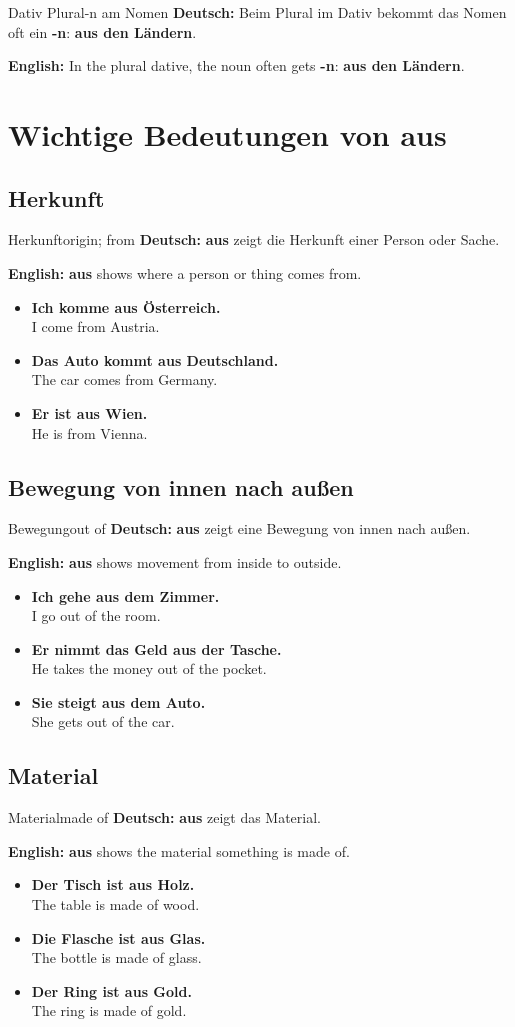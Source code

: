 \documentclass[a4paper,11pt]{article}
\newcommand{\GermanText}[1]{\textbf{Deutsch: }#1\par}
\newcommand{\EnglishText}[1]{{\small\color{SoftGray}\textbf{English: }#1\par}}
\newcommand{\ExampleItem}[2]{\item \textbf{#1}\\{\small\color{SoftGray}#2}}
\begin{document}
\begin{grammarentry}{Dativ Plural}{-n am Nomen}
\GermanText{Beim Plural im Dativ bekommt das Nomen oft ein \textbf{-n}: \textbf{aus den Ländern}.}
\EnglishText{In the plural dative, the noun often gets \textbf{-n}: \textbf{aus den Ländern}.}
\end{grammarentry}

\section{Wichtige Bedeutungen von \glqq aus\grqq}

\subsection{Herkunft}
\begin{grammarentry}{Herkunft}{origin; from}
\GermanText{\textbf{aus} zeigt die Herkunft einer Person oder Sache.}
\EnglishText{\textbf{aus} shows where a person or thing comes from.}
\end{grammarentry}
\begin{exbox}
\begin{itemize}
\ExampleItem{Ich komme aus Österreich.}{I come from Austria.}
\ExampleItem{Das Auto kommt aus Deutschland.}{The car comes from Germany.}
\ExampleItem{Er ist aus Wien.}{He is from Vienna.}
\end{itemize}
\end{exbox}

\subsection{Bewegung von innen nach außen}
\begin{grammarentry}{Bewegung}{out of}
\GermanText{\textbf{aus} zeigt eine Bewegung von innen nach außen.}
\EnglishText{\textbf{aus} shows movement from inside to outside.}
\end{grammarentry}
\begin{exbox}
\begin{itemize}
\ExampleItem{Ich gehe aus dem Zimmer.}{I go out of the room.}
\ExampleItem{Er nimmt das Geld aus der Tasche.}{He takes the money out of the pocket.}
\ExampleItem{Sie steigt aus dem Auto.}{She gets out of the car.}
\end{itemize}
\end{exbox}

\subsection{Material}
\begin{grammarentry}{Material}{made of}
\GermanText{\textbf{aus} zeigt das Material.}
\EnglishText{\textbf{aus} shows the material something is made of.}
\end{grammarentry}
\begin{exbox}
\begin{itemize}
\ExampleItem{Der Tisch ist aus Holz.}{The table is made of wood.}
\ExampleItem{Die Flasche ist aus Glas.}{The bottle is made of glass.}
\ExampleItem{Der Ring ist aus Gold.}{The ring is made of gold.}
\end{itemize}
\end{exbox}
\end{document}
